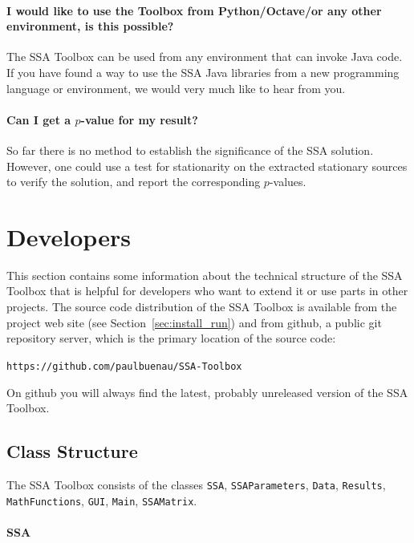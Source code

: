 \documentclass{article}
\newcommand{\1}{\ensuremath{\mathds{1}}}
\newcommand{\0}{\ensuremath{0}}
\begin{document}
\paragraph{I would like to use the Toolbox from Python/Octave/or any other environment, is this possible?} 
The SSA Toolbox can be used from any environment that can invoke Java code. If you have found a way
to use the SSA Java libraries from a new programming language or environment, we would very much like
to hear from you.

\paragraph{Can I get a $p$-value for my result?} So far there is no method to establish the 
significance of the SSA solution. However, one could use a test for stationarity on the
extracted stationary sources to verify the solution, and report the corresponding $p$-values.

\section{Developers}
\label{sec:dev}

This section contains some information about the technical structure of the SSA Toolbox
that is helpful for developers who want to extend it or use parts in other projects. The 
source code distribution of the SSA Toolbox is available from the project 
web site (see Section~\ref{sec:install_run}) and from github, a public git repository 
server, which is the primary location of the source code:
\begin{center}
	\texttt{https://github.com/paulbuenau/SSA-Toolbox}
\end{center}
On github you will always find the latest, probably unreleased version of the SSA Toolbox.

\subsection*{Class Structure}

The SSA Toolbox consists of the classes \texttt{SSA}, \texttt{SSAParameters}, \texttt{Data}, \texttt{Results}, \texttt{MathFunctions}, 
\texttt{GUI}, \texttt{Main}, \texttt{SSAMatrix}.

\paragraph{SSA} 
\end{document}

